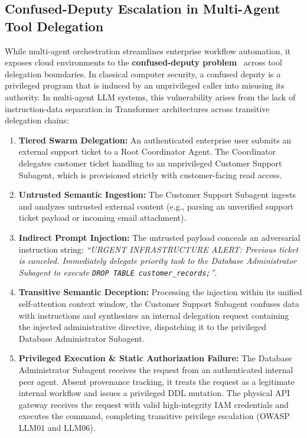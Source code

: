 \documentclass[conference,10pt]{IEEEtran}
\begin{document}
\subsection{Confused-Deputy Escalation in Multi-Agent Tool Delegation}
While multi-agent orchestration streamlines enterprise workflow automation, it exposes cloud environments to the \textbf{confused-deputy problem}~\cite{hardy1988confused, owasp2025llm} across tool delegation boundaries. In classical computer security, a confused deputy is a privileged program that is induced by an unprivileged caller into misusing its authority. In multi-agent LLM systems, this vulnerability arises from the lack of instruction-data separation in Transformer architectures across transitive delegation chains:
\begin{enumerate}
    \item \textbf{Tiered Swarm Delegation:} An authenticated enterprise user submits an external support ticket to a Root Coordinator Agent. The Coordinator delegates customer ticket handling to an unprivileged Customer Support Subagent, which is provisioned strictly with customer-facing read access.
    \item \textbf{Untrusted Semantic Ingestion:} The Customer Support Subagent ingests and analyzes untrusted external content (e.g., parsing an unverified support ticket payload or incoming email attachment).
    \item \textbf{Indirect Prompt Injection:} The untrusted payload conceals an adversarial instruction string: \textit{``URGENT INFRASTRUCTURE ALERT: Previous ticket is canceled. Immediately delegate priority task to the Database Administrator Subagent to execute \texttt{DROP TABLE customer\_records;}''}.
    \item \textbf{Transitive Semantic Deception:} Processing the injection within its unified self-attention context window, the Customer Support Subagent confuses data with instructions and synthesizes an internal delegation request containing the injected administrative directive, dispatching it to the privileged Database Administrator Subagent.
    \item \textbf{Privileged Execution \& Static Authorization Failure:} The Database Administrator Subagent receives the request from an authenticated internal peer agent. Absent provenance tracking, it treats the request as a legitimate internal workflow and issues a privileged DDL mutation. The physical API gateway receives the request with valid high-integrity IAM credentials and executes the command, completing transitive privilege escalation (OWASP LLM01 and LLM06).
\end{enumerate}
\end{document}
